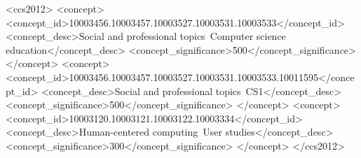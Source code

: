 \documentclass[sigconf]{acmart}
\begin{document}

\begin{CCSXML}
<ccs2012>
<concept>
<concept_id>10003456.10003457.10003527.10003531.10003533</concept_id>
<concept_desc>Social and professional topics~Computer science education</concept_desc>
<concept_significance>500</concept_significance>
</concept>
<concept>
<concept_id>10003456.10003457.10003527.10003531.10003533.10011595</concept_id>
<concept_desc>Social and professional topics~CS1</concept_desc>
<concept_significance>500</concept_significance>
</concept>
<concept>
<concept_id>10003120.10003121.10003122.10003334</concept_id>
<concept_desc>Human-centered computing~User studies</concept_desc>
<concept_significance>300</concept_significance>
</concept>
</ccs2012>
\end{CCSXML}




\maketitle





\end{document}
